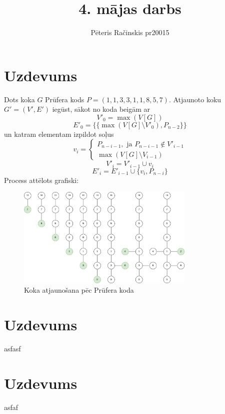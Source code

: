 \documentclass[12pt, a4paper]{article}
\author{Pēteris Račinskis pr20015}
\begin{document}
\title{4. mājas darbs}

\maketitle

\section{Uzdevums}

Dots koka $G$ Prūfera kods $P=(1,1,3,3,1,1,8,5,7)$. Atjaunoto koku $G' = (V',E')$ iegūst, sākot no koda beigām  ar 
\begin{equation}
    V'_0 = \max(V[G])
    \end{equation}
    \begin{equation}
    E'_0 = \lbrace \lbrace \max(V[G] \setminus V'_0), P_{n-2} \rbrace \rbrace
    \end{equation}
un katram elementam izpildot soļus
\begin{equation}
    v_i = 
\begin{cases}
    P_{n-i-1}, \text{ ja } P_{n-i-1} \notin V'_{i-1} \\
    \max(V[G] \setminus V_{i-1})
\end{cases}
\end{equation}
\begin{equation}
    V'_i = V'_{i-1} \cup v_i
\end{equation}
\begin{equation}
    E'_i = E'_{i-1} \cup \lbrace v_i, P_{n-i} \rbrace
\end{equation}
Process attēlots grafiski:

\begin{figure}[h!]
    \centering
    \includegraphics[height=4.8cm,page=1]{pruefer.png}
    \caption{Koka atjaunošana pēc Prūfera koda}
    \label{fig:att}
\end{figure}

\newpage
\section{Uzdevums}

asfasf

\section{Uzdevums}

asfaf
\end{document}
